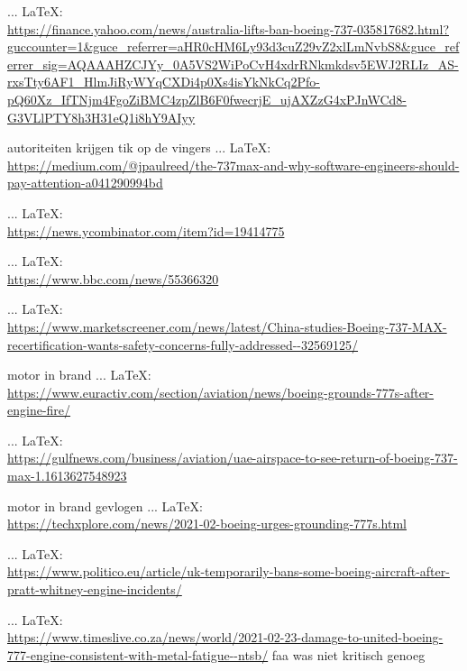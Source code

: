 \begin{thebibliography}{99}
{{{{{{{{							 ... \LaTeX:\\ \url{https://finance.yahoo.com/news/australia-lifts-ban-boeing-737-035817682.html?guccounter=1&guce_referrer=aHR0cHM6Ly93d3cuZ29vZ2xlLmNvbS8&guce_referrer_sig=AQAAAHZCJYy_0A5VS2WiPoCvH4xdrRNkmkdsv5EWJ2RLIz_AS-rxsTty6AF1_HlmJiRyWYqCXDi4p0Xs4isYkNkCq2Pfo-pQ60Xz_IfTNjm4FgoZiBMC4zpZlB6F0fwecrjE_ujAXZzG4xPJnWCd8-G3VLlPTY8h3H31eQ1i8hY9AIyy}
							
							autoriteiten krijgen tik op de vingers
							 ... \LaTeX:\\ \url{https://medium.com/@jpaulreed/the-737max-and-why-software-engineers-should-pay-attention-a041290994bd}
							
							 ... \LaTeX:\\ \url{https://news.ycombinator.com/item?id=19414775}
							
							 ... \LaTeX:\\ \url{https://www.bbc.com/news/55366320}
							
							 ... \LaTeX:\\ \url{https://www.marketscreener.com/news/latest/China-studies-Boeing-737-MAX-recertification-wants-safety-concerns-fully-addressed--32569125/}
							
							motor in brand
							 ... \LaTeX:\\ \url{https://www.euractiv.com/section/aviation/news/boeing-grounds-777s-after-engine-fire/}
							
							 ... \LaTeX:\\ \url{https://gulfnews.com/business/aviation/uae-airspace-to-see-return-of-boeing-737-max-1.1613627548923}
							
							motor in brand gevlogen
							 ... \LaTeX:\\ \url{https://techxplore.com/news/2021-02-boeing-urges-grounding-777s.html}
							
							 ... \LaTeX:\\ \url{https://www.politico.eu/article/uk-temporarily-bans-some-boeing-aircraft-after-pratt-whitney-engine-incidents/}
							
							 ... \LaTeX:\\ \url{https://www.timeslive.co.za/news/world/2021-02-23-damage-to-united-boeing-777-engine-consistent-with-metal-fatigue--ntsb/}
							\cite{reuters23022021777metalfatigue}
							faa was niet kritisch genoeg
							
}}}}}}}}
\end{thebibliography}
